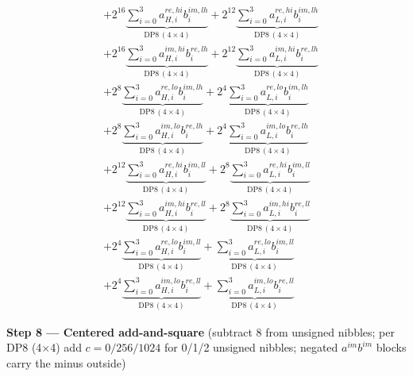\documentclass[fleqn]{article}
\newcommand{\DPop}[3]{\mathrm{DP#1}\,(#2\!\times\!#3)}
\begin{document}
\begin{align*}
  & + 2^{16}\underbrace{\sum_{i=0}^{3} a_{H,i}^{re,hi} b_i^{im,lh}}_{\DPop{8}{4}{4}} + 2^{12}\underbrace{\sum_{i=0}^{3} a_{L,i}^{re,hi} b_i^{im,lh}}_{\DPop{8}{4}{4}} \\[0.4em]
  & + 2^{16}\underbrace{\sum_{i=0}^{3} a_{H,i}^{im,hi} b_i^{re,lh}}_{\DPop{8}{4}{4}} + 2^{12}\underbrace{\sum_{i=0}^{3} a_{L,i}^{im,hi} b_i^{re,lh}}_{\DPop{8}{4}{4}} \\[0.4em]
  & + 2^{8}\underbrace{\sum_{i=0}^{3} a_{H,i}^{re,lo} b_i^{im,lh}}_{\DPop{8}{4}{4}} + 2^{4}\underbrace{\sum_{i=0}^{3} a_{L,i}^{re,lo} b_i^{im,lh}}_{\DPop{8}{4}{4}} \\[0.4em]
  & + 2^{8}\underbrace{\sum_{i=0}^{3} a_{H,i}^{im,lo} b_i^{re,lh}}_{\DPop{8}{4}{4}} + 2^{4}\underbrace{\sum_{i=0}^{3} a_{L,i}^{im,lo} b_i^{re,lh}}_{\DPop{8}{4}{4}} \\[0.4em]
  & + 2^{12}\underbrace{\sum_{i=0}^{3} a_{H,i}^{re,hi} b_i^{im,ll}}_{\DPop{8}{4}{4}} + 2^{8}\underbrace{\sum_{i=0}^{3} a_{L,i}^{re,hi} b_i^{im,ll}}_{\DPop{8}{4}{4}} \\[0.4em]
  & + 2^{12}\underbrace{\sum_{i=0}^{3} a_{H,i}^{im,hi} b_i^{re,ll}}_{\DPop{8}{4}{4}} + 2^{8}\underbrace{\sum_{i=0}^{3} a_{L,i}^{im,hi} b_i^{re,ll}}_{\DPop{8}{4}{4}} \\[0.4em]
  & + 2^{4}\underbrace{\sum_{i=0}^{3} a_{H,i}^{re,lo} b_i^{im,ll}}_{\DPop{8}{4}{4}} + \underbrace{\sum_{i=0}^{3} a_{L,i}^{re,lo} b_i^{im,ll}}_{\DPop{8}{4}{4}} \\[0.4em]
  & + 2^{4}\underbrace{\sum_{i=0}^{3} a_{H,i}^{im,lo} b_i^{re,ll}}_{\DPop{8}{4}{4}} + \underbrace{\sum_{i=0}^{3} a_{L,i}^{im,lo} b_i^{re,ll}}_{\DPop{8}{4}{4}}
\end{align*}


\textbf{Step 8 --- Centered add-and-square}\quad
{\small(subtract $8$ from unsigned nibbles; per DP8 (4$\times$4) add $c=0/256/1024$ for 0/1/2 unsigned nibbles; negated $a^{im}b^{im}$ blocks carry the minus outside)}
\end{document}
